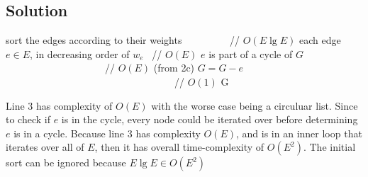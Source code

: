 \subsection*{Solution}

\begin{codebox}
\li sort the edges according to their weights \ \ \ \ \ \ \ \ \  // $O(E \lg E)$
\li \For each edge $e \in E$, in decreasing order of $w_e$ \    // $O(E)$
    \Then
    \li \If $e$ is part of a cycle of $G$  \ \ \ \ \ \ \ \ \ \ \ \ \ \ \ \ \ \ \ \    // $O(E)$ (from 2c)
        \Then
        \li $G = G - e$   \ \ \ \ \ \ \ \ \ \ \ \ \ \ \ \ \ \ \ \ \ \ \ \ \ \ \ \ \ \ \ \ \ \    // $O(1)$
        \End
    \End
\li \Return G
\end{codebox}

Line 3 has complexity of $O(E)$ with the worse case being a circuluar list. Since to check if $e$ is in the cycle, every node could be iterated over before determining $e$ is in a cycle. Because line 3 has complexity $O(E)$, and is in an inner loop that iterates over all of $E$, then it has overall time-complexity of $O(E^{2})$. The initial sort can be ignored because $E \lg E \in O(E^{2})$
